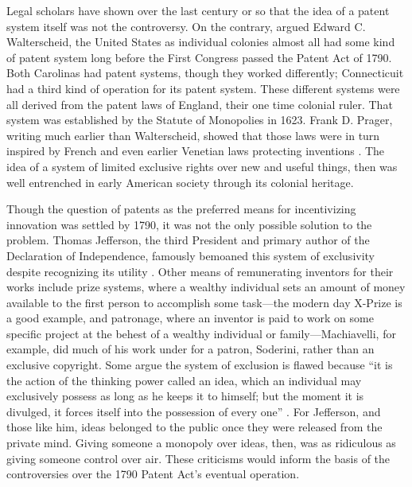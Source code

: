 \documentclass[pdftex,12pt,letterpaper]{article}
\begin{document}
Legal scholars have shown over the last century or so that the idea of a patent system itself was not the controversy. On the contrary, argued Edward C. Walterscheid, the United States as individual colonies almost all had some kind of patent system long before the First Congress passed the Patent Act of 1790. Both Carolinas had patent systems, though they worked differently; Connecticuit had a third kind of operation for its patent system. These different systems were all derived from the patent laws of England, their one time colonial ruler. \autocite{Walterscheid1997} That system was established by the Statute of Monopolies in 1623. Frank D. Prager, writing much earlier than Walterscheid, showed that those laws were in turn inspired by French and even earlier Venetian laws protecting inventions \autocite{Prager1944a}. The idea of a system of limited exclusive rights over new and useful things, then was well entrenched in early American society through its colonial heritage.

Though the question of patents as the preferred means for incentivizing innovation was settled by 1790, it was not the only possible solution to the problem. Thomas Jefferson, the third President and primary author of the Declaration of Independence, famously bemoaned this system of exclusivity despite recognizing its utility \autocite{Jefferson1813}. Other means of remunerating inventors for their works include prize systems, where a wealthy individual sets an amount of money available to the first person to accomplish some task---the modern day X-Prize is a good example, and patronage, where an inventor is paid to work on some specific project at the behest of a wealthy individual or family---Machiavelli, for example, did much of his work under for a patron, Soderini, rather than an exclusive copyright. Some argue the system of exclusion is flawed because ``it is the action of the thinking power called an idea, which an individual may exclusively possess as long as he keeps it to himself; but the moment it is divulged, it forces itself into the possession of every one'' \autocite{Jefferson1813}. For Jefferson, and those like him, ideas belonged to the public once they were released from the private mind. Giving someone a monopoly over ideas, then, was as ridiculous as giving someone control over air. These criticisms would inform the basis of the controversies over the 1790 Patent Act's eventual operation.
\end{document}
